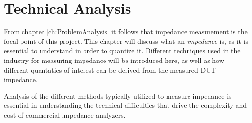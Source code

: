 \chapter{Technical Analysis} \label{ch:TechnicalAnalysis}
From chapter \ref{ch:ProblemAnalysis} it follows that impedance measurement is the focal point of this project. This chapter will discuss what an \textit{impedance} is, as it is essential to understand in order to quantize it. Different techniques used in the industry for measuring impedance will be introduced here, as well as how different quantaties of interest can be derived from the measured DUT impedance. 

Analysis of the different methods typically utilized to measure impedance is essential in understanding the technical difficulties that drive the complexity and cost of commercial impedance analyzers.

